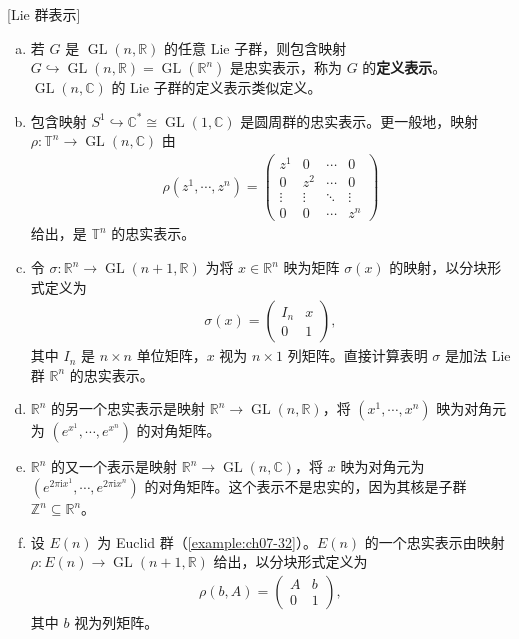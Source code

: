 \documentclass[../../main.tex]{subfiles}
\begin{document}
\begin{example}\label{example:ch07-36}[Lie 群表示]
\begin{enumerate}[(a)]
\item 若 $G$ 是 $\operatorname{GL}(n,\mathbb{R})$ 的任意 Lie 子群，则包含映射 $G\hookrightarrow\operatorname{GL}(n,\mathbb{R})=\operatorname{GL}(\mathbb{R}^n)$ 是忠实表示，称为 $G$ 的\textbf{定义表示}。$\operatorname{GL}(n,\mathbb{C})$ 的 Lie 子群的定义表示类似定义。

\item 包含映射 $S^1\hookrightarrow\mathbb{C}^*\cong\operatorname{GL}(1,\mathbb{C})$ 是圆周群的忠实表示。更一般地，映射 $\rho\colon\mathbb{T}^n\to\operatorname{GL}(n,\mathbb{C})$ 由
\begin{align*}
\rho(z^1,\cdots ,z^n)=\begin{pmatrix}
z^1&0&\cdots&0\\
0&z^2&\cdots&0\\
\vdots&\vdots&\ddots&\vdots\\
0&0&\cdots&z^n
\end{pmatrix}
\end{align*}
给出，是 $\mathbb{T}^n$ 的忠实表示。

\item 令 $\sigma\colon\mathbb{R}^n\to\operatorname{GL}(n+1,\mathbb{R})$ 为将 $x\in\mathbb{R}^n$ 映为矩阵 $\sigma(x)$ 的映射，以分块形式定义为
\begin{align*}
\sigma(x)=\begin{pmatrix}I_n&x\\ 0&1\end{pmatrix},
\end{align*}
其中 $I_n$ 是 $n\times n$ 单位矩阵，$x$ 视为 $n\times1$ 列矩阵。直接计算表明 $\sigma$ 是加法 Lie 群 $\mathbb{R}^n$ 的忠实表示。

\item $\mathbb{R}^n$ 的另一个忠实表示是映射 $\mathbb{R}^n\to\operatorname{GL}(n,\mathbb{R})$，将 $(x^1,\cdots ,x^n)$ 映为对角元为 $(e^{x^1},\cdots ,e^{x^n})$ 的对角矩阵。

\item $\mathbb{R}^n$ 的又一个表示是映射 $\mathbb{R}^n\to\operatorname{GL}(n,\mathbb{C})$，将 $x$ 映为对角元为 $(e^{2\pi\mathrm{i}x^1},\cdots ,e^{2\pi\mathrm{i}x^n})$ 的对角矩阵。这个表示不是忠实的，因为其核是子群 $\mathbb{Z}^n\subseteq\mathbb{R}^n$。

\item 设 $E(n)$ 为 Euclid 群（\cref{example:ch07-32}）。$E(n)$ 的一个忠实表示由映射 $\rho\colon E(n)\to\operatorname{GL}(n+1,\mathbb{R})$ 给出，以分块形式定义为
\begin{align*}
\rho(b,A)=\begin{pmatrix}A&b\\ 0&1\end{pmatrix},
\end{align*}
其中 $b$ 视为列矩阵。


\end{enumerate}
\end{example}
\end{document}
